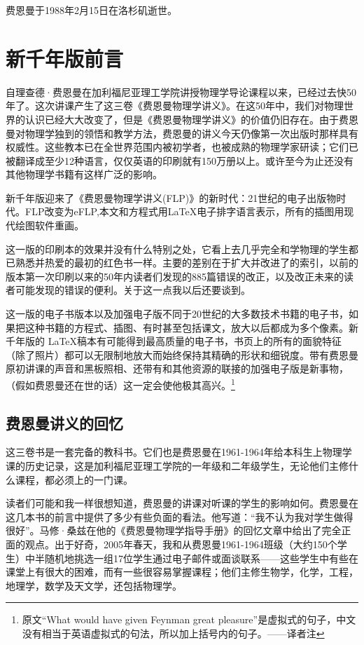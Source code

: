 \documentclass[UTF8, 12pt, a4paper, twoside]{ctexbook}
\begin{document}
费恩曼于1988年2月15日在洛杉矶逝世。

\chapter*{新千年版前言}

自理查德·费恩曼在加利福尼亚理工学院讲授物理学导论课程以来，已经过去快50年了。这次讲课产生了这三卷《费恩曼物理学讲义》。在这50年中，我们对物理世界的认识已经大大改变了，但是《费恩曼物理学讲义》的价值仍旧存在。由于费恩曼对物理学独到的领悟和教学方法，费恩曼的讲义今天仍像第一次出版时那样具有权威性。这些教本已在全世界范围内被初学者，也被成熟的物理学家研读；它们已被翻译成至少12种语言，仅仅英语的印刷就有150万册以上。或许至今为止还没有其他物理学书籍有这样广泛的影响。

新千年版迎来了《费恩曼物理学讲义(FLP)》的新时代：21世纪的电子出版物时代。FLP改变为eFLP,本文和方程式用\LaTeX 电子排字语言表示，所有的插图用现代绘图软件重画。

这一版的印刷本的效果并没有什么特别之处，它看上去几乎完全和学物理的学生都已熟悉并热爱的最初的红色书一样。主要的差别在于扩大并改进了的索引，以前的版本第一次印刷以来的50年内读者们发现的885篇错误的改正，以及改正未来的读者可能发现的错误的便利。关于这一点我以后还要谈到。

这一版的电子书版本以及加强电子版不同于20世纪的大多数技术书籍的电子书，如果把这种书籍的方程式、插图、有时甚至包括课文，放大以后都成为多个像素。新千年版的 \LaTeX 稿本有可能得到最高质量的电子书，书页上的所有的面貌特征（除了照片）都可以无限制地放大而始终保持其精确的形状和细锐度。带有费恩曼原初讲课的声音和黑板照相、还带有和其他资源的联接的加强电子版是新事物，（假如费恩曼还在世的话）这一定会使他极其高兴。\footnote{原文“What would have given Feynman great pleasure”是虚拟式的句子，中文没有相当于英语虚拟式的句法，所以加上括号内的句子。——译者注}

\section*{费恩曼讲义的回忆}

这三卷书是一套完备的教科书。它们也是费恩曼在1961-1964年给本科生上物理学课的历史记录，这是加利福尼亚理工学院的一年级和二年级学生，无论他们主修什么课程，都必须上的一门课。

读者们可能和我一样很想知道，费恩曼的讲课对听课的学生的影响如何。费恩曼在这几本书的前言中提供了多少有些负面的看法。他写道：“我不认为我对学生做得很好”。马修·桑兹在他的《费恩曼物理学指导手册》的回忆文章中给出了完全正面的观点。出于好奇，2005年春天，我和从费恩曼1961-1964班级（大约150个学生）中半随机地挑选一组17位学生通过电子邮件或面谈联系——这些学生中有些在课堂上有很大的困难，而有一些很容易掌握课程；他们主修生物学，化学，工程，地理学，数学及天文学，还包括物理学。
\end{document}
